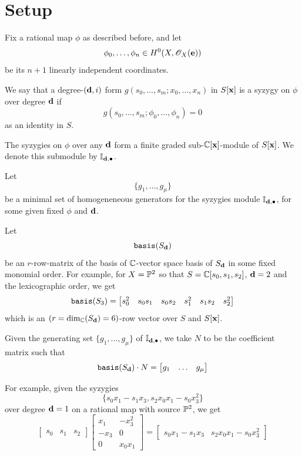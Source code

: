\documentclass[]{beamer}
\begin{document}
\section{Setup}

\begin{frame}
Fix a rational map $\phi$ as described before, and let
\[
	\phi_0,\ldots,\phi_n\in H^0(X,\mathscr{O}_X(\mathbf e))
\]
be its $n+1$ linearly independent coordinates.

We say that a degree-$(\mathbf d,i)$ form $g(s_0,\ldots,s_m;x_0,\ldots,x_n)$ in $S[\mathbf x]$ is
a syzygy on $\phi$ over degree $\mathbf d$ if
\[
	g(s_0,\ldots,s_m;\phi_0,\ldots,\phi_n)=0
\]
as an identity in $S$.

The syzygies on $\phi$ over any $\mathbf d$ form a finite graded sub-$\mathbb{C}[\mathbf x]$-module of $S[\mathbf x]$.
We denote this submodule by $\mathbb{I}_{\mathbf d,\bullet}$.
\end{frame}

\begin{frame}
Let
\[
	\{g_1,\ldots,g_\mu\}
\]
be a minimal set of homogeneneous generators for the syzygies module $\mathbb{I}_{\mathbf d,\bullet}$,
for some given fixed $\phi$ and $\mathbf d$.

Let
\[
	\mathop{\tt basis}(S_\mathbf d)
\]
be an $r$-row-matrix of the basis of $\mathbb{C}$-vector space basis of $S_\mathbf d$ in some fixed
monomial order. For example, for $X=\mathbb{P}^2$ so that $S=\mathbb{C}[s_0,s_1,s_2]$, $\mathbf d=2$
and the lexicographic order, we get
\[
	\mathop{\tt basis}(S_3)=\begin{bmatrix}s_0^2& s_0s_1& s_0s_2& s_1^2& s_1s_2& s_2^2\end{bmatrix}
\]
which is an $(r=\dim_{\mathbb{C}}(S_\mathbf d)=6)$-row vector over $S$ and $S[\mathbf x]$.
\end{frame}

\begin{frame}
Given the generating set $\{g_1,\ldots,g_\mu\}$ of $\mathbb{I}_{\mathbf d,\bullet}$,
we take $N$ to be the coefficient matrix such that
\[
	\mathop{\tt basis}(S_\mathbf d)\cdot N=\begin{bmatrix}g_1& \ldots& g_\mu\end{bmatrix}
\]

For example, given the syzygies
\[
	\{s_0x_1-s_1x_3, s_2x_0x_1-s_0x_3^2\}
\]
over degree $\mathbf d=1$ on a rational map with source $\mathbb{P}^2$, we get
\[
	\begin{bmatrix}s_0& s_1& s_2\end{bmatrix} \begin{bmatrix}x_1& -x_3^2\\ -x_3& 0\\ 0& x_0x_1\end{bmatrix}=
	\begin{bmatrix}s_0x_1-s_1x_3& s_2x_0x_1-s_0x_3^2\end{bmatrix}
\]
\end{frame}
\end{document}
